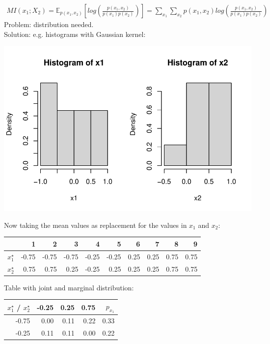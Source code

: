 {\begin{enumerate}[a)]
  \begin{align*}
  	MI(x_1 ; X_2 ) =  \mathbb{E}_{p(x_1, x_2)} \left[ log\left(\frac{p(x_1, x_2)}{p(x_1) p(x_2)} \right) \right] = \sum_{x_1} \sum_{x_2} p(x_1, x_2) log\left(\frac{p(x_1, x_2)}{p(x_1) p(x_2)} \right)
  \end{align*}
  Problem: distribution needed. \\
  Solution: e.g. histograms with Gaussian kernel:
  \begin{center}
  	\includegraphics[width=0.8\maxwidth]{figure/hist_x1_x2.pdf}
  \end{center}
  Now taking the mean values as replacement for the values in $x_1$ and $x_2$:
  \begin{table}[H]
  	\centering
  	\begin{tabular}{r|rrrrrrrrr}
  		\hline
  		& 1 & 2 & 3 & 4 & 5 & 6 & 7 & 8 & 9 \\ 
  		\hline
  		$x_1^\star$ & -0.75 & -0.75 & -0.75 & -0.25 & -0.25 & 0.25 & 0.25 & 0.75 & 0.75 \\ 
  		$x_2^\star$ & 0.75 & 0.75 & 0.25 & -0.25 & 0.25 & 0.25 & 0.25 & 0.75 & 0.75 \\ 
  		\hline
  	\end{tabular}
  \end{table}  
  Table with joint and marginal distribution: 
  \begin{table}[H]
  	\centering
  	\begin{tabular}{r|rrr|r}
  		\hline
  		$x_1^\star$ / $x_2^\star$& -0.25 & 0.25 & 0.75 & $p_{x_1}$ \\ 
  		\hline
  		-0.75 & 0.00 & 0.11 & 0.22 & 0.33 \\ 
  		-0.25 & 0.11 & 0.11 & 0.00 & 0.22 \\ 

\end{tabular}
\end{table}
\end{enumerate}}
